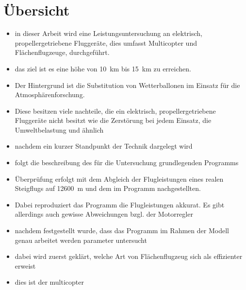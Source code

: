 \chapter*{Übersicht}
\begin{itemize}
	\item in dieser Arbeit wird eine Leistungsuntersuchung an elektrisch, propellergetriebene Fluggeräte, dies umfasst Multicopter und Flächenflugzeuge, durchgeführt. 
	\item das ziel ist es eine höhe von \SI{10}{km} bis \SI{15}{km} zu erreichen. 
	\item Der Hintergrund ist die Substitution von Wetterballonen im Einsatz für die Atmosphärenforschung. 
	\item Diese besitzen viele nachteile, die ein elektrisch, propellergetriebene Fluggeräte nicht besitzt wie die Zerstörung bei jedem Einsatz, die Umweltbelastung und ähnlich
	\item nachdem ein kurzer Standpunkt der Technik dargelegt wird 
	\item folgt die beschreibung des für die Untersuchung grundlegenden Programms
	\item Überprüfung erfolgt mit dem Abgleich der Flugleistungen eines realen Steigflugs auf \SI{12600}{m} und dem im Programm nachgestellten.
	\item Dabei reproduziert das Programm die Flugleistungen akkurat. Es gibt allerdings auch gewisse Abweichungen bzgl. der Motorregler
	\item nachdem festgestellt wurde, dass das Programm im Rahmen der Modell genau arbeitet werden parameter untersucht
	\item dabei wird zuerst geklärt, welche Art von Flächenflugzeug sich als effizienter erweist
	\item dies ist der multicopter
\end{itemize}
